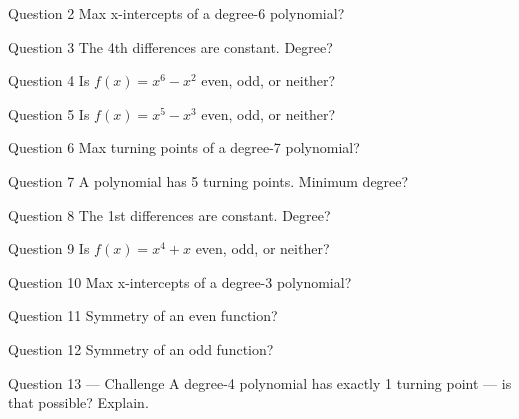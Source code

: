 \documentclass[11pt]{article}
\begin{document}
\begin{qbox}{Question 2}
Max x-intercepts of a degree-6 polynomial?\workspace{2.4cm}
\end{qbox}

\begin{qbox}{Question 3}
The 4th differences are constant. Degree?\workspace{2.4cm}
\end{qbox}

\begin{qbox}{Question 4}
Is $f(x)=x^6-x^2$ even, odd, or neither?\workspace{2.4cm}
\end{qbox}

\begin{qbox}{Question 5}
Is $f(x)=x^5-x^3$ even, odd, or neither?\workspace{2.4cm}
\end{qbox}

\begin{qbox}{Question 6}
Max turning points of a degree-7 polynomial?\workspace{2.4cm}
\end{qbox}

\begin{qbox}{Question 7}
A polynomial has 5 turning points. Minimum degree?\workspace{2.4cm}
\end{qbox}

\begin{qbox}{Question 8}
The 1st differences are constant. Degree?\workspace{2.4cm}
\end{qbox}

\begin{qbox}{Question 9}
Is $f(x)=x^4+x$ even, odd, or neither?\workspace{2.4cm}
\end{qbox}

\begin{qbox}{Question 10}
Max x-intercepts of a degree-3 polynomial?\workspace{2.4cm}
\end{qbox}

\begin{qbox}{Question 11}
Symmetry of an even function?\workspace{2.4cm}
\end{qbox}

\begin{qbox}{Question 12}
Symmetry of an odd function?\workspace{2.4cm}
\end{qbox}

\begin{qbox}{Question 13 --- Challenge}
A degree-4 polynomial has exactly 1 turning point — is that possible? Explain.\workspace{3cm}
\end{qbox}
\end{document}
